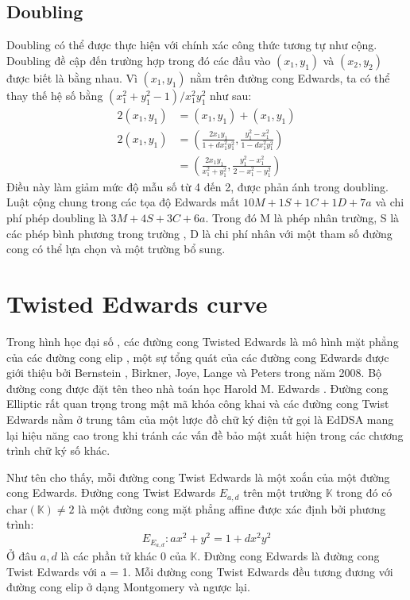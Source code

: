 \documentclass[a4paper,12pt]{report}
\begin{document}
\subsection*{Doubling}
Doubling có thể được thực hiện với chính xác công thức tương tự như cộng. Doubling đề cập đến trường hợp trong đó các đầu vào $(x_1, y_1)$ và $(x_2, y_2)$ được biết là bằng nhau. Vì $(x_1, y_1)$ nằm trên đường cong Edwards, ta có thể thay thế hệ số bằng $(x_1^2 + y_1^2  - 1)/x_1^2y_1^2$ như sau:
\begin{displaymath}
{\begin{aligned}2(x_{1},y_{1})&=(x_{1},y_{1})+(x_{1},y_{1})\\[6pt]2(x_{1},y_{1})&=\left({\frac  {2x_{1}y_{1}}{1+dx_{1}^{2}y_{1}^{2}}},{\frac  {y_{1}^{2}-x_{1}^{2}}{1-dx_{1}^{2}y_{1}^{2}}}\right)\\[6pt]&=\left({\frac  {2x_{1}y_{1}}{x_{1}^{2}+y_{1}^{2}}},{\frac  {y_{1}^{2}-x_{1}^{2}}{2-x_{1}^{2}-y_{1}^{2}}}\right)\end{aligned}}
\end{displaymath}
Điều này làm giảm mức độ mẫu số từ 4 đến 2, được phản ánh trong doubling. Luật cộng chung trong các tọa độ Edwards mất $10M + 1S + 1C + 1D + 7a$ và chi phí phép doubling là $3M + 4S + 3C + 6a$. Trong đó M là phép nhân trường, S là các phép bình phương trong trường , D là chi phí nhân với một tham số đường cong có thể lựa chọn và một trường bổ sung.
\section{Twisted Edwards curve}
Trong hình học đại số , các đường cong Twisted Edwards là mô hình mặt phẳng của các đường cong elip , một sự tổng quát của các đường cong Edwards được giới thiệu bởi Bernstein , Birkner, Joye, Lange và Peters trong năm 2008. Bộ đường cong được đặt tên theo nhà toán học Harold M. Edwards . Đường cong Elliptic rất quan trọng trong mật mã khóa công khai và các đường cong Twist Edwards nằm ở trung tâm của một lược đồ chữ ký điện tử gọi là EdDSA mang lại hiệu năng cao trong khi tránh các vấn đề bảo mật xuất hiện trong các chương trình chữ ký số khác.

Như tên cho thấy, mỗi đường cong Twist Edwards là một xoắn của một đường cong Edwards. Đường cong Twist Edwards $E_{a, d}$ trên một trường $\displaystyle \mathbb{K}$ trong đó có $\displaystyle \mathrm{char}(\mathbb{K}) \neq 2$ là một đường cong mặt phẳng affine được xác định bởi phương trình:
\begin{displaymath}
E_{E_{a,d}}: ax^2 + y^2 = 1 + dx^2y^2
\end{displaymath}
Ở đâu $a, d$ là các phần tử khác 0 của $\displaystyle \mathbb{K}$. Đường cong Edwards là đường cong Twist Edwards với a = 1.
Mỗi đường cong Twist Edwards đều tương đương với đường cong elip ở dạng Montgomery và ngược lại.
\end{document}
